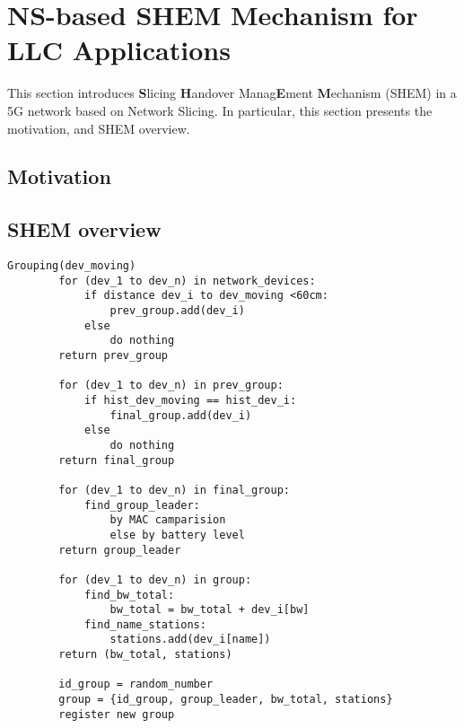 \section{NS-based SHEM Mechanism for LLC Applications}
\label{sec:Grouped_NetSel-RFapproach}

This section introduces \textbf{S}licing \textbf{H}andover Manag\textbf{E}ment \textbf{M}echanism (SHEM) in a 5G network based on Network Slicing. In particular, this section presents the motivation, and SHEM overview.

\subsection{Motivation}
\label{subsec:gm_motivation}




\subsection{SHEM overview}
\label{subsec:parameter_selection}


\noindent
\begin{lstlisting}[mathescape=true, caption={Grouping.}, label=grouping, basicstyle=\scriptsize]
    Grouping(dev_moving)
    	for (dev_1 to dev_n) in network_devices:
    		if distance dev_i to dev_moving <60cm:
    			prev_group.add(dev_i)
    		else
    			do nothing
    	return prev_group
    
    	for (dev_1 to dev_n) in prev_group:
    		if hist_dev_moving == hist_dev_i:
    			final_group.add(dev_i)
    		else
    			do nothing
    	return final_group
    
    	for (dev_1 to dev_n) in final_group:
    		find_group_leader:
    			by MAC camparision
    			else by battery level
    	return group_leader
    
    	for (dev_1 to dev_n) in group:
    		find_bw_total:
    			bw_total = bw_total + dev_i[bw]
    		find_name_stations:
    			stations.add(dev_i[name])
    	return (bw_total, stations)
    	
    	id_group = random_number
    	group = {id_group, group_leader, bw_total, stations}
    	register new group
\end{lstlisting}

\vspace{5mm}
